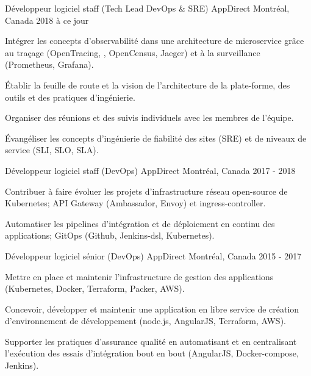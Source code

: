 
\begin{cventries}

  \cventry
    {Développeur logiciel staff (Tech Lead DevOps \& SRE)} %
    {AppDirect} %
    {Montréal, Canada} %
    {2018 à ce jour} %
    {
      \begin{cvitems} %
        \item {Intégrer les concepts d'observabilité dans une architecture de microservice grâce au traçage (OpenTracing, , OpenCensus, Jaeger) et à la surveillance (Prometheus, Grafana).}
        \item {Établir la feuille de route et la vision de l'architecture de la plate-forme, des outils et des pratiques d'ingénierie.}
        \item {Organiser des réunions et des suivis individuels avec les membres de l'équipe.}
        \item {Évangéliser les concepts d'ingénierie de fiabilité des sites (SRE) et de niveaux de service (SLI, SLO, SLA).}
      \end{cvitems}
    }

  \cventry
    {Développeur logiciel staff (DevOps)} %
    {AppDirect} %
    {Montréal, Canada} %
    {2017 - 2018} %
    {
      \begin{cvitems} %
        \item {Contribuer à faire évoluer les projets d'infrastructure réseau open-source de Kubernetes; API Gateway (Ambassador, Envoy) et ingress-controller.}
        \item {Automatiser les pipelines d'intégration et de déploiement en continu des applications; GitOps (Github, Jenkins-dsl, Kubernetes).}
      \end{cvitems}
    }

  \cventry
    {Développeur logiciel sénior (DevOps)} %
    {AppDirect} %
    {Montréal, Canada} %
    {2015 - 2017} %
    {
      \begin{cvitems} %
        \item {Mettre en place et maintenir l'infrastructure de gestion des applications (Kubernetes, Docker, Terraform, Packer, AWS).}
        \item {Concevoir, développer et maintenir une application en libre service de création d'environnement de développement (node.js, AngularJS, Terraform, AWS).}
        \item {Supporter les pratiques d'assurance qualité en automatisant et en centralisant l'exécution des essais d'intégration bout en bout (AngularJS, Docker-compose, Jenkins).}
      \end{cvitems}
    }


\end{cventries}
